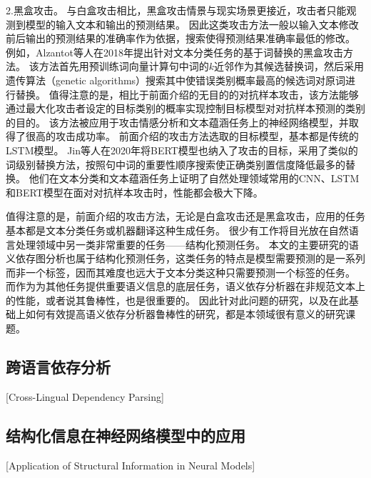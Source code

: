2.黑盒攻击。
与白盒攻击相比，黑盒攻击情景与现实场景更接近，攻击者只能观测到模型的输入文本和输出的预测结果。
因此这类攻击方法一般以输入文本修改前后输出的预测结果的准确率作为依据，搜索使得预测结果准确率最低的修改。
例如，Alzantot等人在2018年提出针对文本分类任务的基于词替换的黑盒攻击方法\cite{alzantot-etal-2018-generating}。
该方法首先用预训练词向量计算句中词的$k$近邻作为其候选替换词，然后采用遗传算法（genetic algorithms）搜索其中使错误类别概率最高的候选词对原词进行替换。
值得注意的是，相比于前面介绍的无目的的对抗样本攻击，该方法能够通过最大化攻击者设定的目标类别的概率实现控制目标模型对对抗样本预测的类别的目的。
该方法被应用于攻击情感分析和文本蕴涵任务上的神经网络模型，并取得了很高的攻击成功率。
前面介绍的攻击方法选取的目标模型，基本都是传统的LSTM模型。
Jin等人在2020年将BERT模型也纳入了攻击的目标\cite{jin-etal-2020-isbert}，采用了类似的词级别替换方法，按照句中词的重要性顺序搜索使正确类别置信度降低最多的替换。
他们在文本分类和文本蕴涵任务上证明了自然处理领域常用的CNN、LSTM和BERT模型在面对对抗样本攻击时，性能都会极大下降。

值得注意的是，前面介绍的攻击方法，无论是白盒攻击还是黑盒攻击，应用的任务基本都是文本分类任务或机器翻译这种生成任务。
很少有工作将目光放在自然语言处理领域中另一类非常重要的任务——结构化预测任务。
本文的主要研究的语义依存图分析也属于结构化预测任务，这类任务的特点是模型需要预测的是一系列而非一个标签，因而其难度也远大于文本分类这种只需要预测一个标签的任务。
而作为为其他任务提供重要语义信息的底层任务，语义依存分析器在非规范文本上的性能，或者说其鲁棒性，也是很重要的。
因此针对此问题的研究，以及在此基础上如何有效提高语义依存分析器鲁棒性的研究，都是本领域很有意义的研究课题。

\subsection{跨语言依存分析}[Cross-Lingual Dependency Parsing]





\subsection{结构化信息在神经网络模型中的应用}[Application of Structural Information in Neural Models]




